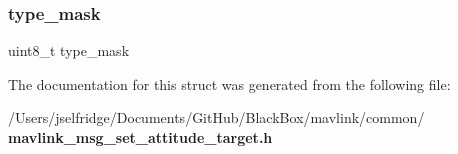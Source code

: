\subsubsection{type\+\_\+mask}
{\footnotesize\ttfamily uint8\+\_\+t type\+\_\+mask}



The documentation for this struct was generated from the following file\+:\begin{DoxyCompactItemize}
\item 
/\+Users/jselfridge/\+Documents/\+Git\+Hub/\+Black\+Box/mavlink/common/\textbf{ mavlink\+\_\+msg\+\_\+set\+\_\+attitude\+\_\+target.\+h}\end{DoxyCompactItemize}
